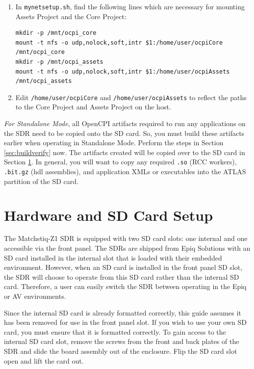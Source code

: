 \begin{enumerate}
\item In \texttt{mynetsetup.sh}, find the following lines which are necessary for mounting Assets Project and the Core Project:
\begin{verbatim}
mkdir -p /mnt/ocpi_core
mount -t nfs -o udp,nolock,soft,intr $1:/home/user/ocpiCore /mnt/ocpi_core
mkdir -p /mnt/ocpi_assets
mount -t nfs -o udp,nolock,soft,intr $1:/home/user/ocpiAssets /mnt/ocpi_assets
\end{verbatim}
 \item Edit \texttt{/home/user/ocpiCore} and \texttt{/home/user/ocpiAssets} to reflect the paths to the Core Project and Assets Project on the host.
\end{enumerate}
\begin{flushleft}
\label{sec:buildNow}
\textit{For Standalone Mode}, all OpenCPI artifacts required to run any applications on the SDR need to be copied onto the SD card.  So, you must build these artifacts earlier when operating in Standalone Mode. Perform the steps in Section \ref{sec:buildverify}  now. The artifacts created will be copied over to the SD card in Section \ref{sec:HW_Setup}. In general, you will want to copy any required \texttt{.so} (RCC workers), \texttt{.bit.gz} (hdl assemblies), and application XMLs or executables into the ATLAS partition of the SD card.
\end{flushleft}
\section{Hardware and SD Card Setup}
\label{sec:HW_Setup}
The Matchstiq-Z1 SDR is equipped with two SD card slots: one internal and one accessible via the front panel. The SDRs are shipped from Epiq Solutions with an SD card installed in the internal slot that is loaded with their embedded environment. However, when an SD card is installed in the front panel SD slot, the SDR will choose to operate from this SD card rather than the internal SD card. Therefore, a user can easily switch the SDR between operating in the Epiq or AV environments.
\begin{flushleft}
Since the internal SD card is already formatted correctly, this guide assumes it has been removed for use in the front panel slot. If you wish to use your own SD card, you must ensure that it is formatted correctly. To gain access to the internal SD card slot, remove the screws from the front and back plates of the SDR and slide the board assembly out of the enclosure. Flip the SD card slot open and lift the card out.
\end{flushleft}
